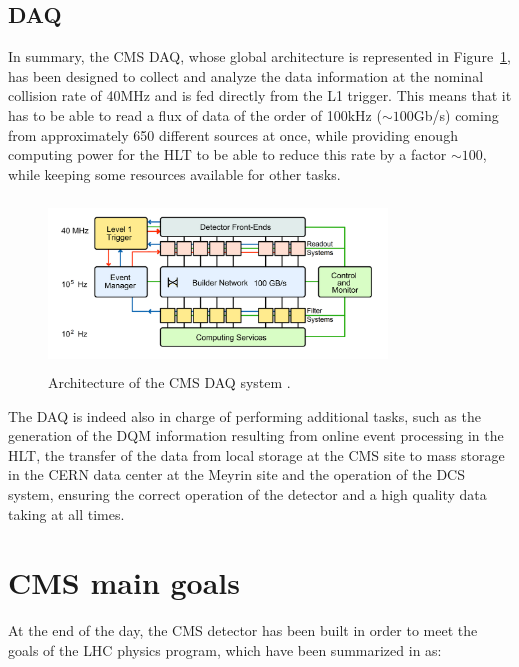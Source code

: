 \documentclass[a4paper, 10pt, openright]{report}
\begin{document}
\subsection{\acf{DAQ}} \label{subsection:DAQ}

In summary, the CMS \ac{DAQ}, whose global architecture is represented in Figure~\ref{fig:CMSDAQ}, has been designed to collect and analyze the data information at the nominal collision rate of 40MHz and is fed directly from the \ac{L1} trigger. This means that it has to be able to read a flux of data of the order of 100kHz ($\sim 100$Gb/s) coming from approximately 650 different sources at once, while providing enough computing power for the \ac{HLT} to be able to reduce this rate by a factor $\sim 100$, while keeping some resources available for other tasks.

\begin{figure}[htbp]
\begin{center}
\includegraphics[width=9cm, height=4.5cm]{figs/CMSDAQ.png}
\caption{Architecture of the \ac{CMS} \ac{DAQ} system \cite{CMSDescription}.}
\label{fig:CMSDAQ}
\end{center}
\end{figure}

The \ac{DAQ} is indeed also in charge of performing additional tasks, such as the generation of the \ac{DQM} information resulting
from online event processing in the \ac{HLT}, the transfer of the data from local storage at the \ac{CMS} site to mass storage in the \ac{CERN} data center at the Meyrin site and the operation of the \ac{DCS} system, ensuring the correct operation of the detector and a high quality data taking at all times. %

\section{\acs{CMS} main goals}

At the end of the day, the \ac{CMS} detector has been built in order to meet the goals of the \ac{LHC} physics program, which have been summarized in \cite{CMSDescription} as:
\end{document}
